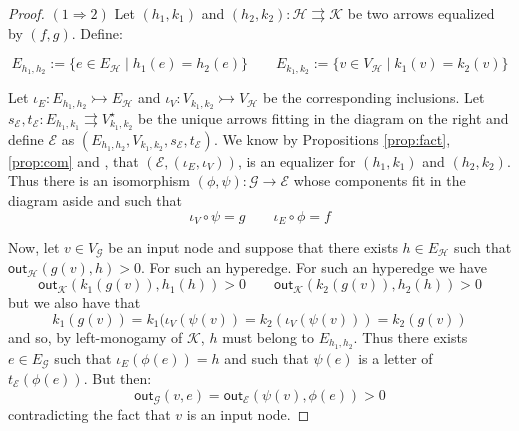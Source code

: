 \documentclass[3p]{elsarticle}
\newcommand{\outd}[1]{\mathsf{out}_{\mathcal{#1}}}
\newcommand{\mto}{\rightarrowtail}
\theoremstyle{remark}
\theoremstyle{definition}
\begin{document}
\regmono*
\begin{proof}\label{proof:regmon} $(1\Rightarrow 2)$ Let $(h_1, k_1)$ and $(h_2, k_2): \mathcal{H}\rightrightarrows \mathcal{K}$  be two arrows  equalized by $(f,g)$. Define:
	
	\noindent 
 \begin{minipage}[r]{.7\linewidth} 	\setlength{\parindent}{1.5em}
 \vspace{-.5cm}
 	\[ E_{h_1, h_2}:= \{e\in E_{\mathcal{H}} \mid h_1(e) = h_2(e)\} \qquad E_{k_1, k_2}:= \{v\in V_{\mathcal{H}} \mid k_1(v) = k_2(v)\} \]	
 	
Let $\iota_E\colon E_{h_1, h_2}\mto E_{\mathcal{H}} $ and $\iota_V\colon V_{k_1, k_2}\mto V_{\mathcal{H}}$ be the corresponding inclusions. Let 
$s_{\mathcal{E}}, t_{\mathcal{E}} \colon E_{h_1, k_1}\rightrightarrows V^\star_{k_1, k_2}$ be the unique arrows fitting in the diagram on the right and define $\mathcal{E}$ as $(E_{h_1, h_2}, V_{k_1, k_2}, s_{\mathcal{E}}, t_{\mathcal{E}})$. We know by  Propositions \ref{prop:fact}, \ref{prop:com} and , that  $(\mathcal{E}, (\iota_E, \iota_V))$, is an equalizer  for $(h_1, k_1)$ and $(h_2, k_2)$. Thus there is an isomorphism $(\phi, \psi) \colon \mathcal{G}\to \mathcal{E}$ whose components fit in the diagram aside and such that
\[\iota_V\circ \psi = g \qquad \iota_E\circ \phi = f\] 
		\end{minipage}\hfill 	 \begin{minipage}[r]{.3\linewidth}
	 \end{minipage}
	
	Now, let $v\in V_{\mathcal{G}}$ be an input node and suppose that there exists $h\in E_{\mathcal{H}}$ such that $\outd{H}(g(v), h)>0$. For such an hyperedge. For such an hyperedge we have
	\[\outd{K}(k_1(g(v)), h_1(h)) >0 \qquad \outd{K}(k_2(g(v)), h_2(h)) >0 \]
	but we also have that 
	\[k_1(g(v))=k_1(\iota_V(\psi(v))=k_2(\iota_V(\psi(v)))=k_2(g(v))\]
	and so, by left-monogamy of $\mathcal{K}$, $h$ must belong to $E_{h_1, h_2}$. Thus there exists $e\in E_{\mathcal{G}}$ such that $\iota_E(\phi(e))=h$ and such that $\psi(e)$ is a letter of $t_{\mathcal{E}}(\phi(e))$. But then:
	\[\outd{G}(v, e) = \outd{E}(\psi(v), \phi(e)) > 0\]
	contradicting the fact that $v$ is an input node.


\end{proof}
\end{document}
